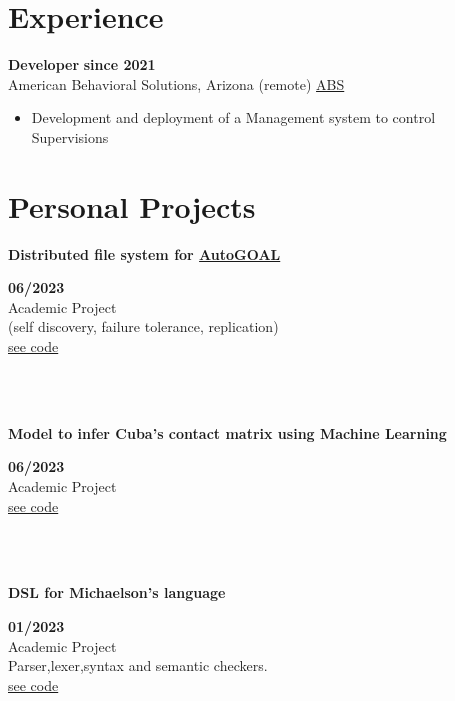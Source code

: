 \documentclass{article}
\begin{document}
\section*{Experience}
    \textbf{Developer} \hfill \textbf{since 2021}\\ 
    American Behavioral Solutions, Arizona (remote)
    \href{americanbehavioralsolutions.com}{ABS}
    \begin{itemize}
        \item Development and deployment of a Management system to control Supervisions
    \end{itemize}


\section*{Personal Projects}
\begin{minipage}{0.8\textwidth}
\parbox{0.8\linewidth}{\textbf{Distributed file system for \href{https://autogoal.github.io/}{AutoGOAL}}}\hfill \textbf{06/2023} \\
Academic Project\\
(self discovery, failure tolerance, replication)\\
\href{https://github.com/geeksLabTech/kade-drive}{see code}\\
\end{minipage} \hfill {}\\\\
\begin{minipage}{0.8\textwidth}
\parbox{0.8\linewidth}{\textbf{Model to infer Cuba's contact matrix using Machine Learning}} \hfill \textbf{06/2023}\\
Academic Project\\
\href{https://github.com/geeksLabTech/epidemic-classification-ml-project}{see code}\\
\end{minipage} \hfill {}\\\\
\begin{minipage}{0.8\textwidth}
\parbox{0.8\linewidth}{\textbf{DSL for Michaelson's language}} \hfill \textbf{01/2023}\\
Academic Project\\
Parser,lexer,syntax and semantic checkers.\\
\href{https://github.com/geeksLabTech/compilation-dsl-project}{see code}\\
\end{minipage} \hfill {}\\\\
\end{document}
